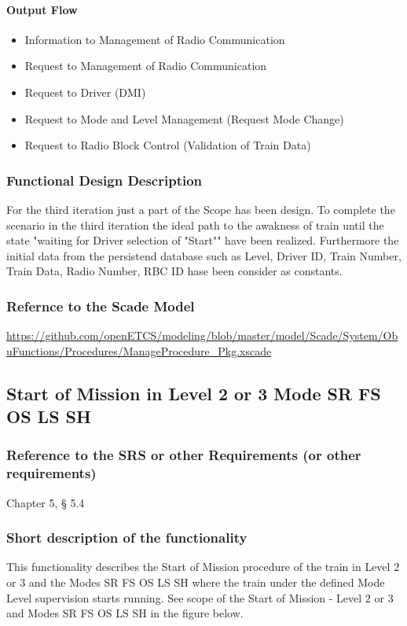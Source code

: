 \paragraph{Output Flow}
\begin{itemize}
\item Information to Management of Radio Communication
\item Request to Management of Radio Communication
\item Request to Driver (DMI)
\item Request to Mode and Level Management (Request Mode Change)
\item Request to Radio Block Control (Validation of Train Data)
\end{itemize}

\subsubsection{Functional Design Description}
For the third iteration just a part of the Scope has been design. To complete the scenario in the third iteration the ideal path to the awakness of train until the state "waiting for Driver selection of "Start"" have been realized. Furthermore the initial data from the persistend database such as Level, Driver ID, Train Number, Train Data, Radio Number, RBC ID hase been consider as constants. 

\subsubsection{Refernce to the Scade Model}
\url{https://github.com/openETCS/modeling/blob/master/model/Scade/System/ObuFunctions/Procedures/ManageProcedure_Pkg.xscade}

\subsection{Start of Mission in Level 2 or 3 Mode SR FS OS LS SH}

\subsubsection{Reference to the SRS or other Requirements (or other requirements)}
Chapter 5, § 5.4

\subsubsection{Short description of the functionality}
This functionality describes the Start of Mission procedure of the train in Level 2 or 3 and the Modes SR FS OS LS SH where the train under the defined Mode Level supervision starts running.
See scope of the Start of Mission - Level 2 or 3 and Modes SR FS OS LS SH in the figure below.

